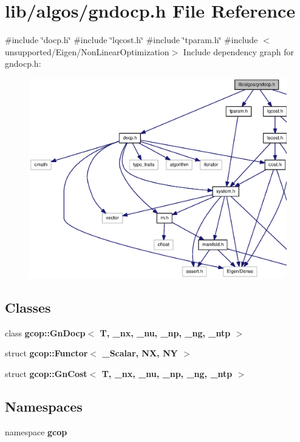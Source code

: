 \section{lib/algos/gndocp.h \-File \-Reference}
\label{gndocp_8h}
{\ttfamily \#include \char`\"{}docp.\-h\char`\"{}}\*
{\ttfamily \#include \char`\"{}lqcost.\-h\char`\"{}}\*
{\ttfamily \#include \char`\"{}tparam.\-h\char`\"{}}\*
{\ttfamily \#include $<$unsupported/\-Eigen/\-Non\-Linear\-Optimization$>$}\*
\-Include dependency graph for gndocp.\-h\-:
\nopagebreak
\begin{figure}[H]
\begin{center}
\leavevmode
\includegraphics[width=350pt]{gndocp_8h__incl}
\end{center}
\end{figure}
\subsection*{\-Classes}
\begin{DoxyCompactItemize}
\item 
class {\bf gcop\-::\-Gn\-Docp$<$ T, \-\_\-nx, \-\_\-nu, \-\_\-np, \-\_\-ng, \-\_\-ntp $>$}
\item 
struct {\bf gcop\-::\-Functor$<$ \-\_\-\-Scalar, N\-X, N\-Y $>$}
\item 
struct {\bf gcop\-::\-Gn\-Cost$<$ T, \-\_\-nx, \-\_\-nu, \-\_\-np, \-\_\-ng, \-\_\-ntp $>$}
\end{DoxyCompactItemize}
\subsection*{\-Namespaces}
\begin{DoxyCompactItemize}
\item 
namespace {\bf gcop}
\end{DoxyCompactItemize}
